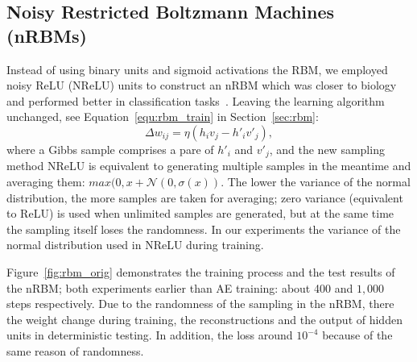 \subsection{Noisy Restricted Boltzmann Machines (nRBMs)}
\DIFaddbegin \label{subsec:exp_RBM}
\DIFaddend Instead of using binary units and sigmoid activations \DIFaddbegin {}\DIFaddend the RBM, we employed noisy ReLU (NReLU) units to construct an nRBM which was closer to biology and performed better in classification tasks~\citep{nair2010rectified}.
Leaving the learning algorithm unchanged, see Equation~\ref{equ:rbm_train} in Section~\ref{sec:rbm}:
\begin{equation}
\Delta w_{ij} = \eta (h_iv_j - h'_iv'_j),
\label{equ:rbm}
\end{equation} 
where a Gibbs sample comprises a pare of $h'_i$ and $v'_j$, and the new sampling method NReLU is equivalent to generating multiple samples in the meantime and averaging them: $max(0, x+\mathcal{N}(0, \sigma(x))$.
The lower the variance of the normal distribution, the more samples are taken for averaging;
zero variance (equivalent to ReLU) is used when unlimited samples are generated, but at the same time the sampling itself loses the randomness.
In our experiments the variance of the normal distribution used in NReLU \DIFdelbegin {}\DIFdelend \DIFaddbegin {} during training.


Figure~\ref{fig:rbm_orig} demonstrates the training process and the test results of the nRBM; both experiments \DIFdelbegin {}\DIFdelend \DIFaddbegin {}\DIFaddend earlier than AE training: about 400 and $1,000$ steps respectively.
Due to the randomness of the sampling in the nRBM, there \DIFdelbegin {}\DIFdelend \DIFaddbegin {}\DIFaddend the weight change during training, the reconstructions and the output of hidden units in deterministic testing.
In addition, the loss \DIFdelbegin {}\DIFdelend \DIFaddbegin {}\DIFaddend around $10^{-4}$ because of the same reason of randomness.

